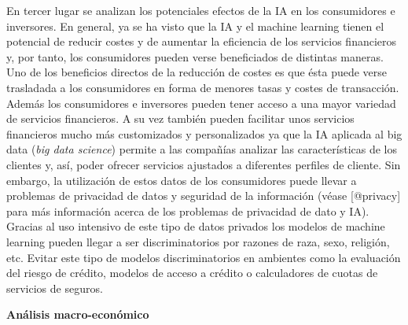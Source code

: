 \documentclass[]{article}
\begin{document}
En tercer lugar se analizan los potenciales efectos de la IA en los
consumidores e inversores. En general, ya se ha visto que la IA y el
machine learning tienen el potencial de reducir costes y de aumentar la
eficiencia de los servicios financieros y, por tanto, los consumidores
pueden verse beneficiados de distintas maneras. Uno de los beneficios
directos de la reducción de costes es que ésta puede verse trasladada a
los consumidores en forma de menores tasas y costes de transacción.
Además los consumidores e inversores pueden tener acceso a una mayor
variedad de servicios financieros. A su vez también pueden facilitar
unos servicios financieros mucho más customizados y personalizados ya
que la IA aplicada al big data (\emph{big data science}) permite a las
compañías analizar las características de los clientes y, así, poder
ofrecer servicios ajustados a diferentes perfiles de cliente. Sin
embargo, la utilización de estos datos de los consumidores puede llevar
a problemas de privacidad de datos y seguridad de la información (véase
{[}@privacy{]} para más información acerca de los problemas de
privacidad de dato y IA). Gracias al uso intensivo de este tipo de datos
privados los modelos de machine learning pueden llegar a ser
discriminatorios por razones de raza, sexo, religión, etc. Evitar este
tipo de modelos discriminatorios en ambientes como la evaluación del
riesgo de crédito, modelos de acceso a crédito o calculadores de cuotas
de servicios de seguros.

\textbf{Análisis macro-económico}
\end{document}
